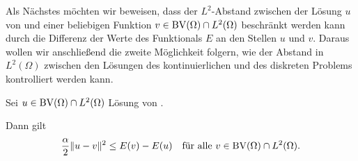 Als Nächstes möchten wir beweisen, dass der $L^2$-Abstand zwischen der Lösung
$u$ von  und einer beliebigen Funktion
$v\in\textup{BV}(\Omega)\cap L^2(\Omega)$ beschränkt werden kann durch die Differenz
der Werte des Funktionals $E$ an den Stellen $u$ und $v$.
Daraus wollen wir anschließend die zweite Möglichkeit folgern,
wie der Abstand in $L^2(\Omega)$ zwischen den Lösungen des kontinuierlichen 
und des diskreten Problems kontrolliert werden kann.

\begin{theorem}
  \label{thm:convexity}
  Sei $u\in\textup{BV}(\Omega)\cap L^2(\Omega)$ Lösung von 
  .

  Dann gilt 
  \begin{align*}
    \frac{\alpha}{2}\Vert u-v\Vert^2 \leq E(v)-E(u)\quad
    \text{für alle } v\in\textup{BV}(\Omega)\cap L^2(\Omega).
  \end{align*}
\end{theorem}

